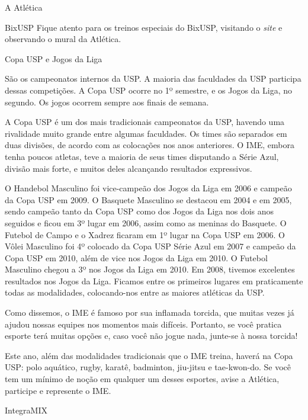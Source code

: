 \begin{secao}{A Atlética}
\begin{subsecao}{BixUSP}
Fique atento para os treinos especiais do BixUSP, visitando o \textit{site} e observando
o mural da Atlética.

\end{subsecao}
\begin{subsecao}{Copa USP e Jogos da Liga}

São os campeonatos internos da USP. A maioria das faculdades da USP participa
dessas competições. A Copa USP ocorre no 1º semestre, e os Jogos da Liga,
no segundo. Os jogos ocorrem sempre aos finais de semana.

A Copa USP é um dos mais tradicionais campeonatos da USP, havendo uma
rivalidade muito grande entre algumas faculdades. Os times são separados em
duas divisões, de acordo com as colocações nos anos anteriores. O IME, embora
tenha poucos atletas, teve a maioria de seus times disputando a Série Azul,
divisão mais forte, e muitos deles alcançando resultados expressivos.

O Handebol Masculino foi vice-campeão dos Jogos da Liga em 2006 e campeão da
Copa USP em 2009. O Basquete Masculino se destacou em 2004 e em 2005, sendo
campeão tanto da Copa USP como dos Jogos da Liga nos dois anos seguidos e ficou
em 3º lugar em 2006, assim como as meninas do Basquete. O Futebol de
Campo e o Xadrez ficaram em 1º lugar na Copa USP em 2006. O Vôlei
Masculino foi 4º colocado da Copa USP Série Azul em 2007 e campeão da Copa
USP em 2010, além de vice nos Jogos da Liga em 2010. O Futebol Masculino chegou
a 3º nos Jogos da Liga em 2010.
Em 2008, tivemos excelentes resultados nos Jogos da Liga. Ficamos entre os
primeiros lugares em praticamente todas as modalidades, colocando-nos entre as
maiores atléticas da USP.

Como dissemos, o IME é famoso por sua inflamada torcida, que muitas vezes já
ajudou nossas equipes nos momentos mais difíceis. Portanto, se você pratica
esporte terá muitas opções e, caso você não jogue nada, junte-se à nossa torcida!

Este ano, além das modalidades tradicionais que o IME treina, haverá na Copa
USP: polo aquático, rugby, karatê, badminton, jiu-jitsu e tae-kwon-do. Se
você tem um mínimo de noção em qualquer um desses esportes, avise a Atlética,
participe e represente o IME.

\end{subsecao}
\begin{subsecao}{IntegraMIX}


\end{subsecao}
\end{secao}
